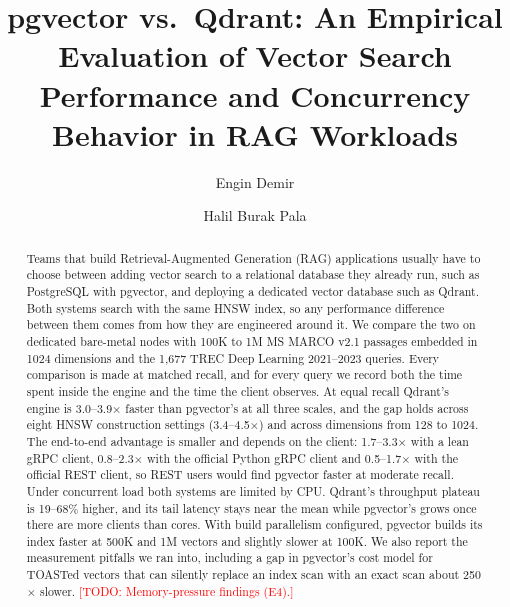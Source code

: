 \documentclass[sigconf, nonacm]{acmart}
\newcommand{\todo}[1]{\textcolor{red}{[TODO: #1]}}
\newcommand{\todo}[1]{\errmessage{Unresolved TODO: #1}}
\begin{document}
\title{pgvector vs.\ Qdrant: An Empirical Evaluation of Vector Search\\
Performance and Concurrency Behavior in RAG Workloads}

\author{Engin Demir}

\author{Halil Burak Pala}

\renewcommand{\shortauthors}{Demir and Pala}

\begin{abstract}
Teams that build Retrieval-Augmented Generation (RAG) applications usually have to
choose between adding vector search to a relational database they already run, such as
PostgreSQL with pgvector, and deploying a dedicated vector database such as Qdrant.
Both systems search with the same HNSW index, so any performance difference between
them comes from how they are engineered around it. We compare the two on dedicated
bare-metal nodes with 100K to 1M MS MARCO v2.1 passages embedded in 1024 dimensions and
the 1{,}677 TREC Deep Learning 2021--2023 queries. Every comparison is made at matched
recall, and for every query we record both the time spent inside the engine and the
time the client observes. At equal recall Qdrant's engine is 3.0--3.9$\times$ faster
than pgvector's at all three scales, and the gap holds across eight HNSW construction
settings (3.4--4.5$\times$) and across dimensions from 128 to 1024. The end-to-end
advantage is smaller and depends on the client: 1.7--3.3$\times$ with a lean gRPC
client, 0.8--2.3$\times$ with the official Python gRPC client and 0.5--1.7$\times$ with
the official REST client, so REST users would find pgvector faster at moderate recall.
Under concurrent load both systems are limited by CPU. Qdrant's throughput plateau is
19--68\% higher, and its tail latency stays near the mean while pgvector's grows once
there are more clients than cores. With build parallelism configured, pgvector
builds its index faster at 500K and 1M vectors and slightly slower at 100K. We also report the measurement pitfalls
we ran into, including a gap in pgvector's cost model for TOASTed vectors that can
silently replace an index scan with an exact scan about 250$\times$ slower.
\todo{Memory-pressure findings (E4).}
\end{abstract}
\end{document}
